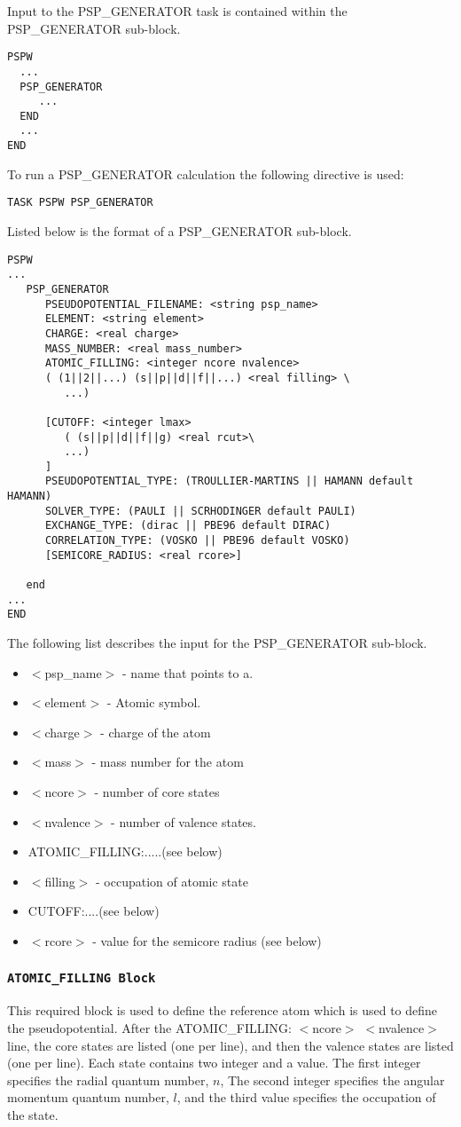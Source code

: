 Input to the PSP\_GENERATOR task is contained within the
PSP\_GENERATOR  sub-block.
\begin{verbatim}
PSPW
  ...
  PSP_GENERATOR
     ...
  END
  ...
END
\end{verbatim}
To run a PSP\_GENERATOR calculation the following directive 
is used:
\begin{verbatim}
TASK PSPW PSP_GENERATOR
\end{verbatim}
Listed below is the format of a PSP\_GENERATOR sub-block.
\begin{verbatim}
PSPW
... 
   PSP_GENERATOR
      PSEUDOPOTENTIAL_FILENAME: <string psp_name>
      ELEMENT: <string element>
      CHARGE: <real charge>
      MASS_NUMBER: <real mass_number>
      ATOMIC_FILLING: <integer ncore nvalence>
      ( (1||2||...) (s||p||d||f||...) <real filling> \
         ...)
      
      [CUTOFF: <integer lmax> 
         ( (s||p||d||f||g) <real rcut>\
         ...)
      ]
      PSEUDOPOTENTIAL_TYPE: (TROULLIER-MARTINS || HAMANN default HAMANN)
      SOLVER_TYPE: (PAULI || SCRHODINGER default PAULI)
      EXCHANGE_TYPE: (dirac || PBE96 default DIRAC)
      CORRELATION_TYPE: (VOSKO || PBE96 default VOSKO)
      [SEMICORE_RADIUS: <real rcore>]
      
   end
... 
END
\end{verbatim}
The following list describes the input for the PSP\_GENERATOR
sub-block.
\begin{itemize}

        \item $<$psp\_name$>$ - name that points to a.
        \item $<$element$>$ - Atomic symbol.
        \item $<$charge$>$ - charge of the atom
        \item $<$mass$>$ - mass number for the atom
        \item $<$ncore$>$ - number of core states
        \item $<$nvalence$>$ - number of valence states.
        \item ATOMIC\_FILLING:.....(see below)
        \item $<$filling$>$ - occupation of atomic state
        \item CUTOFF:....(see below) 
        \item $<$rcore$>$ - value for the semicore radius (see below) 
\end{itemize}


\subsubsection{\tt ATOMIC\_FILLING Block}
This required block is used to define the reference atom which is used
to define the pseudopotential. After the ATOMIC\_FILLING: $<$ncore$>$
$<$nvalence$>$ line, the core states are listed (one per line), and
then the valence states are listed (one per line). 
Each state contains two integer and a value.  The first integer
specifies the radial quantum number, $n$,
The second integer specifies the angular momentum quantum number, $l$,
and the third value specifies the occupation of the state.

